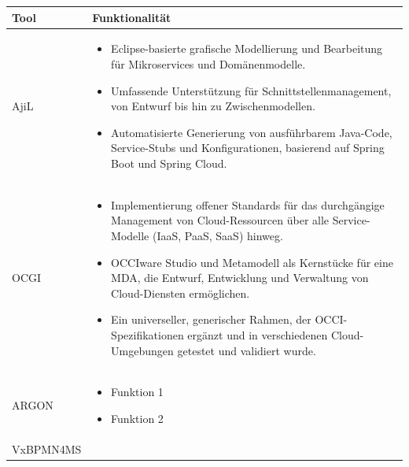 {\begin{table}[h]
\centering
\begin{tabularx}{\textwidth}{|p{}|X|}
\hline
Tool & Funktionalität \\
\hline
AjiL \cite{rademacher} & 
\begin{itemize}[leftmargin=*, nosep, before=\vspace{-0.6\baselineskip}, after=\vspace{-\baselineskip}]
	\item Eclipse-basierte grafische Modellierung und Bearbeitung für Mikroservices und Domänenmodelle.
	\item Umfassende Unterstützung für Schnittstellenmanagement, von Entwurf bis hin zu Zwischenmodellen.
	\item Automatisierte Generierung von ausführbarem Java-Code, Service-Stubs und Konfigurationen, basierend auf Spring Boot und Spring Cloud.
\end{itemize} \\
\hline
OCGI \cite{zalila} & 
\begin{itemize}[leftmargin=*, nosep, before=\vspace{-0.6\baselineskip}, after=\vspace{-\bAaselineskip}]
	\item Implementierung offener Standards für das durchgängige Management von Cloud-Ressourcen über alle Service-Modelle (IaaS, PaaS, SaaS) hinweg.
	\item OCCIware Studio und Metamodell als Kernstücke für eine MDA, die Entwurf, Entwicklung und Verwaltung von Cloud-Diensten ermöglichen.
	\item Ein universeller, generischer Rahmen, der OCCI-Spezifikationen ergänzt und in verschiedenen Cloud-Umgebungen getestet und validiert wurde.
\end{itemize} \\
\hline
ARGON \cite{argon} & 
\begin{itemize}[leftmargin=*, nosep, before=\vspace{-0.6\baselineskip}, after=\vspace{-\baselineskip}]
    \item Funktion 1
    \item Funktion 2
\end{itemize} \\
\hline
VxBPMN4MS \cite{sun} & 
\begin{itemize}[leftmargin=*, nosep, before=\vspace{-0.6\baselineskip}, after=\vspace{-\baselineskip}]

\end{itemize}
\end{tabularx}
\end{table}}
